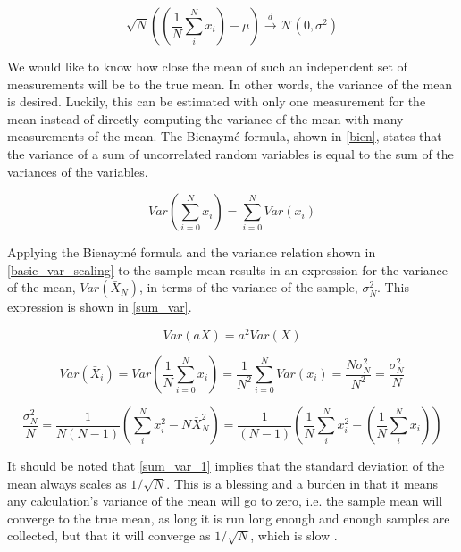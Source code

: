 \begin{equation}
\label{CLT}
\sqrt{N}\left(\left(\frac{1}{N} \sum_i^N x_i \right)-\mu\right) \xrightarrow[]	{d} \mathcal{N}(0,\sigma^2)
\end{equation}

We would like to know how close the mean of such an independent set of measurements will be to the true mean.  In other words, the variance of the mean is desired.  Luckily, this can be estimated with only one measurement for the mean instead of directly computing the variance of the mean with many measurements of the mean.  The Bienaym\'e formula, shown in \eqref{bien}, states that the variance of a sum of uncorrelated random variables is equal to the sum of the variances of the variables.

\begin{equation}
\label{bien}
Var\left(\sum_{i=0}^N x_i \right) = \sum_{i=0}^N Var(x_i)
\end{equation}      

Applying the Bienaym\'e formula and the variance relation shown in \eqref{basic_var_scaling} to the sample mean results in an expression for the variance of the mean, $Var(\bar{X}_N)$, in terms of the variance of the sample, $\sigma_N^2$.  This expression is shown in \eqref{sum_var}.  

\begin{equation}
\label{basic_var_scaling}
Var\left(a X \right) = a^2 Var\left( X \right)
\end{equation}

\begin{equation}
\label{sum_var_1}
Var(\bar{X}_i) = Var\left(\frac{1}{N}\sum_{i=0}^N x_i \right) = \frac{1}{N^2} \sum_{i=0}^N Var(x_i) = \frac{N\sigma_N^2}{N^2} =  \frac{\sigma_N^2}{N} 
\end{equation}

\begin{equation}
\label{sum_var}
 \frac{\sigma_N^2}{N} = \frac{1}{N(N-1)} \left( \sum_i^N x_i^2- N\bar{X}_N^2 \right) = \frac{1}{(N-1)} \left( \frac{1}{N} \sum_i^N x_i^2 - \left(   \frac{1}{N} \sum_i^N x_i \right)   \right)
\end{equation}

It should be noted that \eqref{sum_var_1} implies that the standard deviation of the mean always scales as $1/\sqrt{N}$.  This is a blessing and a burden in that it means any calculation's variance of the mean will go to zero, i.e. the sample mean will converge to the true mean, as long it is run long enough and enough samples are collected, but that it will converge as $1/\sqrt{N}$, which is slow \cite{openmc}.

